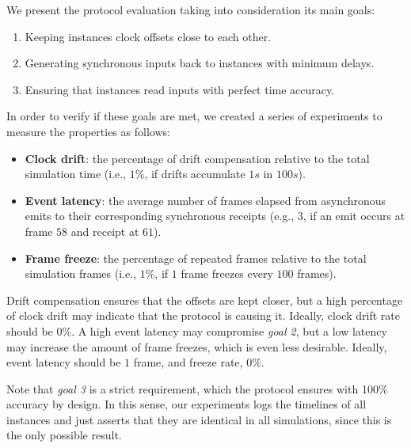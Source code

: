 \documentclass[sigplan,screen]{acmart}
\begin{document}
We present the protocol evaluation taking into consideration its main goals:
%
\begin{enumerate}
\item Keeping instances clock offsets close to each other.
\item Generating synchronous inputs back to instances with minimum delays.
\item Ensuring that instances read inputs with perfect time accuracy.
\end{enumerate}
%
In order to verify if these goals are met, we created a series of experiments
to measure the properties as follows:
%
\begin{itemize}
\item \textbf{Clock drift}:
    the percentage of drift compensation relative to the total simulation time
    (i.e., $1\%$, if drifts accumulate $1s$ in $100s$).
\item \textbf{Event latency}:
    the average number of frames elapsed from asynchronous emits to their
    corresponding synchronous receipts (e.g., $3$, if an emit occurs at frame
    $58$ and receipt at $61$).
\item \textbf{Frame freeze}:
    the percentage of repeated frames relative to the total simulation frames
    (i.e., $1\%$, if $1$ frame freezes every $100$ frames).

\end{itemize}
%
Drift compensation ensures that the offsets are kept closer, but a high
percentage of clock drift may indicate that the protocol is causing it.
Ideally, clock drift rate should be $0\%$.
%
A high event latency may compromise \emph{goal 2}, but a low latency may
increase the amount of frame freezes, which is even less desirable.
Ideally, event latency should be $1$ frame, and freeze rate, $0\%$.
%

%
Note that \emph{goal 3} is a strict requirement, which the protocol ensures
with 100\% accuracy by design.
In this sense, our experiments logs the timelines of all instances and just
asserts that they are identical in all simulations, since this is the only
possible result.
\end{document}
